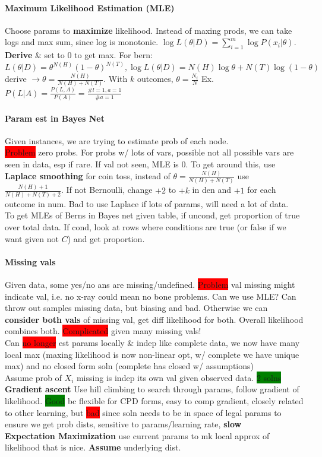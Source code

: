 \paragraph{Maximum Likelihood Estimation (MLE)}Choose params to
\textbf{maximize} likelihood. Instead of maxing prods, we can take
logs and max sum, since log is monotonic. $\log L(\theta|D) =
\sum_{i=1}^m \log P(x_i | \theta)$. \textbf{Derive} \& set to $0$ to
get max. For bern: $L(\theta|D)=\theta^{N(H)}(1-\theta)^{N(T)}, \log
L(\theta|D)=N(H)\log \theta + N(T)\log (1-\theta)$ derive $\to \theta
= \frac{N(H)}{N(H)+N(T)}$. With $k$ outcomes, $\theta = \frac{N_i}{N}$
Ex. $P(L|A)=\frac{P(L,A)}{P(A)}=\frac{\# l=1,a=1}{\# a=1}$
\paragraph{Param est in Bayes Net} Given instances, we are trying to
estimate prob of each node.
\\ \colorbox{red}{Problem} zero probs. For probs w/ lots of vars,
possible not all possible vars are seen in data, esp if rare. If val
not seen, MLE is $0$. To get around this, use \textbf{Laplace
  smoothing} for coin toss, instead of $\theta=\frac{N(H)}{N(H)+N(T)}$
use $\frac{N(H)+1}{N(H)+N(T)+2}$. If not Bernoulli, change $+2$ to
$+k$ in den and $+1$ for each outcome in num. Bad to use Laplace if
lots of params, will need a lot of data.
\\ To get MLEs of Berns in Bayes net given table, if uncond, get
proportion of true over total data. If cond, look at rows where
conditions are true (or false if we want given not $C$) and get
proportion.
\paragraph{Missing vals} Given data, some yes/no ans are
missing/undefined. \colorbox{red}{Problem} val missing might indicate
val, i.e. no x-ray could mean no bone problems. Can we use MLE? Can
throw out samples missing data, but biasing and bad. Otherwise we can
\textbf{consider both vals} of missing val, get diff likelihood for
both. Overall likelihood combines both. \colorbox{red}{Complicated}
given many missing vals!
\\ Can \colorbox{red}{no longer} est params locally \& indep like
complete data, we now have many local max (maxing likelihood is now
non-linear opt, w/ complete we have unique max) and no closed form
soln (complete has closed w/ assumptions)
\\ Assume prob of $X_i$ missing is indep its own val given observed
data. \colorbox{green}{2 solns} \textbf{Gradient ascent} Use hill
climbing to search through params, follow gradient of
likelihood. \colorbox{green}{Good} bc flexible for CPD forms, easy to
comp gradient, closely related to other learning, but
\colorbox{red}{bad} since soln needs to be in space of legal params to
ensure we get prob dists, sensitive to params/learning rate,
\textbf{slow}
\\ \textbf{Expectation Maximization} use current params to mk local
approx of likelihood that is nice. \textbf{Assume} underlying
dist.
